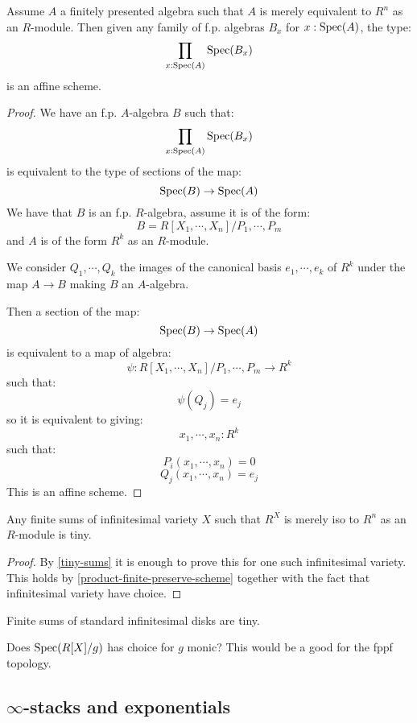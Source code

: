 \begin{lemma}\label{product-finite-preserve-scheme}
Assume $A$ a finitely presented algebra such that $A$ is merely equivalent to $R^n$ as an $R$-module. Then given any family of f.p. algebras $B_x$ for $x:\operatorname{Spec}(A)$, the type:
\[\prod_{x:\operatorname{Spec}(A)}\operatorname{Spec}(B_x)\]
is an affine scheme.
\end{lemma}

\begin{proof}
We have an f.p. $A$-algebra $B$ such that:
\[\prod_{x:\operatorname{Spec}(A)}\operatorname{Spec}(B_x)\]
is equivalent to the type of sections of the map:
\[\operatorname{Spec}(B)\to\operatorname{Spec}(A)\]
We have that $B$ is an f.p. $R$-algebra, assume it is of the form:
\[B = R[X_1,\cdots,X_n]/P_1,\cdots,P_m\]
and $A$ is of the form $R^k$ as an $R$-module. 

We consider $Q_1,\cdots,Q_k$ the images of the canonical basis $e_1,\cdots,e_k$ of $R^k$ under the map $A\to B$ making $B$ an $A$-algebra.

Then a section of the map:
\[\operatorname{Spec}(B)\to\operatorname{Spec}(A)\] 
is equivalent to a map of algebra:
\[\psi: R[X_1,\cdots,X_n]/P_1,\cdots,P_m \to R^k\]
such that:
\[\psi(Q_j) = e_j\]
so it is equivalent to giving:
\[x_1,\cdots,x_n : R^k\]
such that:
\[P_i(x_1,\cdots,x_n) = 0\]
\[Q_j(x_1,\cdots,x_n) = e_j\]
This is an affine scheme.
\end{proof}

\begin{lemma}\label{sums-infinitesimal-tiny}
Any finite sums of infinitesimal variety $X$ such that $R^X$ is merely iso to $R^n$ as an $R$-module is tiny.
\end{lemma}

\begin{proof}
By \cref{tiny-sums} it is enough to prove this for one such infinitesimal variety. This holds by \cref{product-finite-preserve-scheme} together with the fact that infinitesimal variety have choice.
\end{proof}

\begin{example}
Finite sums of standard infinitesimal disks are tiny.
\end{example}

Does $\operatorname{Spec}(R[X]/g)$ has choice for $g$ monic? This would be a good for the fppf topology.

\subsection{$\infty$-stacks and exponentials}

